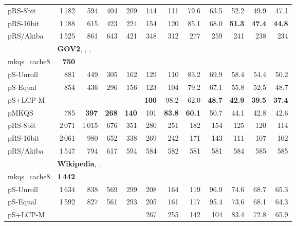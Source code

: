 \documentclass[a4paper]{myjournal}
\begin{document}
\begin{table}
\begin{tabular}{l|*{11}{r}|@{}}
     pRS-8bit & 1\,182 &     594 &     404 &     209 &     144 &      111 &     79.6 &     63.5 &     52.2 &     49.9 &     47.1 \\
    pRS-16bit & 1\,188 &     615 &     423 &     224 &     154 &      120 &     85.1 &     68.0 & \bf 51.3 & \bf 47.4 & \bf 44.8 \\
    pRS/Akiba & 1\,525 &     861 &     643 &     421 &     348 &      312 &      277 &      259 &      241 &      238 &      234 \\ \hline
& \multicolumn{11}{l|}{\textbf{GOV2}, , , } \\ \cline{2-12}
mkqs\_cache8 & \bf 750 &  &  &  &  &  &  &  &  &  &  \\
pS-Unroll &    881 &     449 &     305 &     162 &     129 &      110 &     83.2 &     69.9 &     58.4 &     54.4 &     50.2 \\
 pS-Equal &    854 &     436 &     296 &     156 &     123 &      104 &     79.2 &     67.1 &     55.8 &     52.5 &     48.7 \\
 pS+LCP-M &        &         &         &         & \bf 100 &     98.2 &     62.0 & \bf 48.7 & \bf 42.9 & \bf 39.5 & \bf 37.4 \\
        pMKQS &    785 & \bf 397 & \bf 268 & \bf 140 &     101 & \bf 83.8 & \bf 60.1 &     50.7 &     44.1 &     42.8 &     42.6 \\
     pRS-8bit & 2\,071 &  1\,015 &     676 &     351 &     280 &      251 &      182 &      154 &      125 &      120 &      114 \\
    pRS-16bit & 2\,061 &     980 &     652 &     338 &     269 &      242 &      171 &      143 &      111 &      107 &      102 \\
    pRS/Akiba & 1\,547 &     794 &     617 &     594 &     584 &      582 &      581 &      581 &      584 &      585 &      585 \\ \hline
& \multicolumn{11}{l|}{\textbf{Wikipedia}, , } \\ \cline{2-12}
mkqs\_cache8 & \bf 1\,442 &  &  &  &  &  &  &  &  &  &  \\
pS-Unroll & 1\,634 &     838 &     569 &     299 &     208 &     164 &     119 &     96.9 &     74.6 &     68.7 &     65.3 \\
 pS-Equal & 1\,592 &     827 &     561 &     293 &     205 &     161 &     117 &     95.4 &     73.6 &     68.1 &     64.3 \\
 pS+LCP-M &        &         &         &         &     267 &     255 &     142 &      104 &     83.4 &     72.8 &     65.9 \\

\end{tabular}
\end{table}
\end{document}
